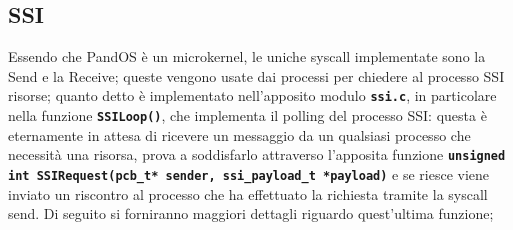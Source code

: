 \documentclass{article}
\begin{document}
\subsection{SSI}
Essendo che \textmu PandOS è un microkernel, le uniche syscall implementate sono la Send e la Receive; queste vengono usate dai processi per chiedere al processo SSI risorse; quanto detto è implementato nell'apposito modulo \texttt{\textbf{ssi.c}}, in particolare nella funzione \texttt{\textbf{SSILoop()}}, che implementa il polling del processo SSI: questa è eternamente in attesa di ricevere un messaggio da un qualsiasi processo che necessità una risorsa, prova a soddisfarlo attraverso l'apposita funzione \texttt{\textbf{unsigned int SSIRequest(pcb\_t* sender, ssi\_payload\_t *payload)}} e se riesce viene inviato un riscontro al processo che ha effettuato la richiesta tramite la syscall send. Di seguito si forniranno maggiori dettagli riguardo quest'ultima funzione;

\newpage
\end{document}
